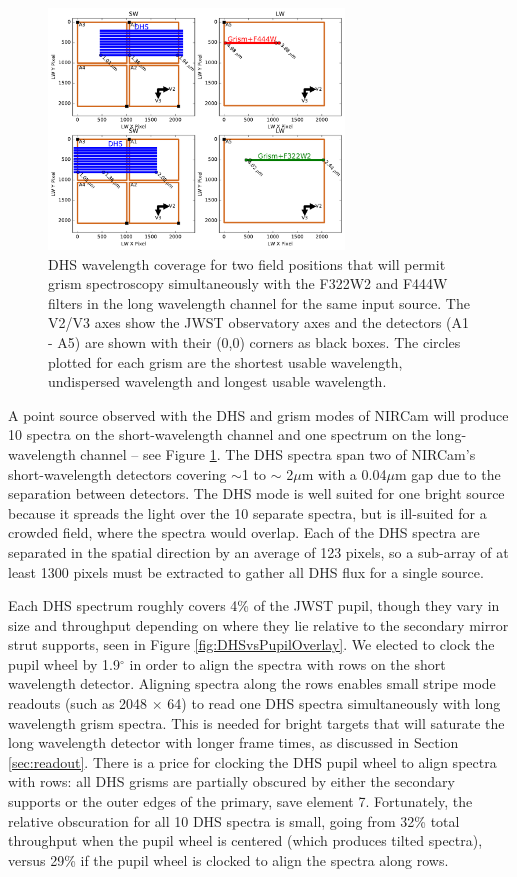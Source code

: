 \documentclass[iop]{emulateapj}
\newcommand{\DHSgap}{0.04}
\begin{document}
\begin{figure}
\centering
\includegraphics[width=0.7\textwidth]{grism_pos_for_max_wcoverage.pdf}
\caption{DHS wavelength coverage for two field positions that will permit grism spectroscopy simultaneously with the F322W2 and F444W filters in the long wavelength channel for the same input source. The V2/V3 axes show the JWST observatory axes and the detectors (A1 - A5) are shown with their (0,0) corners as black boxes. The circles plotted for each grism are the shortest usable wavelength, undispersed wavelength and longest usable wavelength.}\label{fig:DHSwaveWGrism}
\end{figure}

A point source observed with the DHS and grism modes of NIRCam will produce 10 spectra on the short-wavelength channel and one spectrum on the long-wavelength channel -- see Figure \ref{fig:DHSwaveWGrism}.
The DHS spectra span two of NIRCam's short-wavelength detectors covering $\sim$1 to $\sim$ 2$\mu$m with a \DHSgap$\mu$m gap due to the separation between detectors.
The DHS mode is well suited for one bright source because it spreads the light over the 10 separate spectra, but is ill-suited for a crowded field, where the spectra would overlap.
Each of the DHS spectra are separated in the spatial direction by an average of 123 pixels, so a sub-array of at least 1300 pixels must be extracted to gather all DHS flux for a single source.

Each DHS spectrum roughly covers 4\% of the JWST pupil, though they vary in size and throughput depending on where they lie relative to the secondary mirror strut supports, seen in Figure \ref{fig:DHSvsPupilOverlay}.
We elected to clock the pupil wheel by 1.9$^\circ$ in order to align the spectra with rows on the short wavelength detector.
Aligning spectra along the rows enables small stripe mode readouts (such as 2048 $\times$ 64) to read one DHS spectra simultaneously with long wavelength grism spectra.
This is needed for bright targets that will saturate the long wavelength detector with longer frame times, as discussed in Section \ref{sec:readout}.
There is a price for clocking the DHS pupil wheel to align spectra with rows: all DHS grisms are partially obscured by either the secondary supports or the outer edges of the primary, save element 7.
Fortunately, the relative obscuration for all 10 DHS spectra is small, going from 32\% total throughput when the pupil wheel is centered (which produces tilted spectra), versus 29\% if the pupil wheel is clocked to align the spectra along rows.
\end{document}
